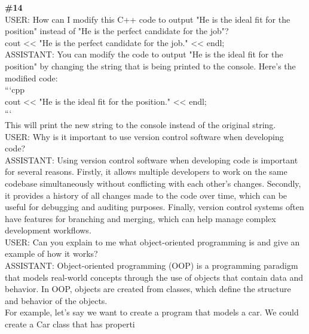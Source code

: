 \documentclass[10pt]{article}
\begin{document}
\begin{Form}
\begin{tcolorbox}[colback=convbg,colframe=itemframe,boxrule=0.8pt,arc=2pt,breakable,left=6pt,right=6pt,top=5pt,bottom=5pt]
{\footnotesize\textbf{\#14}}\\[3pt]
{\footnotesize USER: How can I modify this C++ code to output "He is the ideal fit for the position" instead of "He is the perfect candidate for the job"? \\[2pt]
cout << "He is the perfect candidate for the job." << endl; \\[2pt]
ASSISTANT: You can modify the code to output "He is the ideal fit for the position" by changing the string that is being printed to the console. Here's the modified code: \\[2pt]
```cpp \\[2pt]
cout << "He is the ideal fit for the position." << endl; \\[2pt]
``` \\[2pt]
This will print the new string to the console instead of the original string.   \\[2pt]
USER: Why is it important to use version control software when developing code? \\[2pt]
ASSISTANT: Using version control software when developing code is important for several reasons. Firstly, it allows multiple developers to work on the same codebase simultaneously without conflicting with each other's changes. Secondly, it provides a history of all changes made to the code over time, which can be useful for debugging and auditing purposes. Finally, version control systems often have features for branching and merging, which can help manage complex development workflows.   \\[2pt]
USER: Can you explain to me what object-oriented programming is and give an example of how it works? \\[2pt]
ASSISTANT: Object-oriented programming (OOP) is a programming paradigm that models real-world concepts through the use of objects that contain data and behavior. In OOP, objects are created from classes, which define the structure and behavior of the objects. \\[2pt]
For example, let's say we want to create a program that models a car. We could create a Car class that has properti}
\end{tcolorbox}
\vspace{-1pt}
\CheckBox[name=q14c,width=1.6ex,height=1.6ex,bordercolor={0.45 0.45 0.45}]{~\textcolor{cbox}{COMPACT}}\quad
\CheckBox[name=q14d,width=1.6ex,height=1.6ex,bordercolor={0.45 0.45 0.45}]{~\textcolor{dbox}{DIFFUSE}}\quad
\CheckBox[name=q14n,width=1.6ex,height=1.6ex,bordercolor={0.45 0.45 0.45}]{~\textcolor{nbox}{NONE}}

\end{Form}
\end{document}
